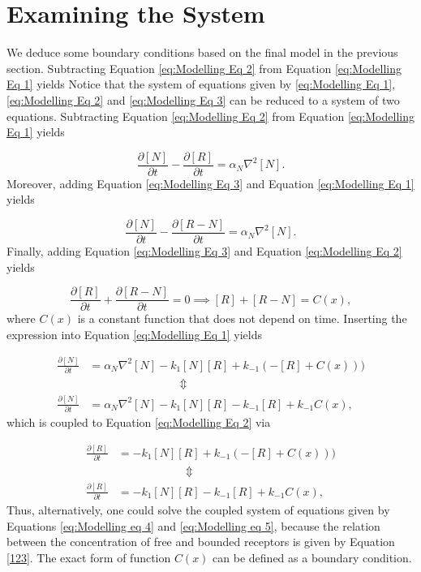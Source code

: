 \documentclass{article}
\begin{document}
\section{Examining the System}
We deduce some boundary conditions based on the final model in the previous section. Subtracting Equation \eqref{eq:Modelling Eq 2} from Equation \eqref{eq:Modelling Eq 1} yields
Notice that the system of equations given by \eqref{eq:Modelling Eq 1}, \eqref{eq:Modelling Eq 2} and \eqref{eq:Modelling Eq 3} can be reduced to a system of two equations. Subtracting Equation \eqref{eq:Modelling Eq 2} from Equation \eqref{eq:Modelling Eq 1} yields

\begin{equation}\label{eqn:addition1}
    \frac{\partial [N]}{\partial t}-\frac{\partial [R]}{\partial t} = \alpha_N\nabla^2[N].
\end{equation}
Moreover, adding Equation \eqref{eq:Modelling Eq 3} and Equation \eqref{eq:Modelling Eq 1} yields

\begin{equation}\label{eqn:addition2}
    \frac{\partial [N]}{\partial t}-\frac{\partial [R-N]}{\partial t} = \alpha_N\nabla^2[N].
\end{equation}
Finally, adding Equation \eqref{eq:Modelling Eq 3} and Equation \eqref{eq:Modelling Eq 2} yields 

\begin{equation}\label{123}
    \frac{\partial [R]}{\partial t}+\frac{\partial [R-N]}{\partial t} = 0 \implies [R] + [R-N] = C(x),  
\end{equation}
where $C(x)$ is a constant function that does not depend on time. Inserting the expression into Equation \eqref{eq:Modelling Eq 1} yields 

\begin{align}
    \frac{\partial [N]}{\partial t} &= \alpha_N\nabla^2[N]- k_1[N][R] + k_{-1}(-[R]+C(x)))\nonumber\\
    &\qquad \qquad \qquad \qquad \Updownarrow \nonumber\\
    \frac{\partial [N]}{\partial t} &= \alpha_N\nabla^2[N]- k_1[N][R] - k_{-1}[R] + k_{-1}C(x) \label{eq:Modelling eq 4},
\end{align}
which is coupled to Equation \eqref{eq:Modelling Eq 2} via 

\begin{align}
    \frac{\partial [R]}{\partial t} &= - k_1[N][R] + k_{-1}(-[R]+C(x)))\nonumber\\
    &\qquad \qquad \qquad \Updownarrow \nonumber\\
    \frac{\partial [R]}{\partial t} &= - k_1[N][R] - k_{-1}[R] + k_{-1}C(x) \label{eq:Modelling eq 5},
\end{align}
Thus, alternatively, one could solve the coupled system of equations given by Equations \eqref{eq:Modelling eq 4} and \eqref{eq:Modelling eq 5}, because the relation between the concentration of free and bounded receptors is given by Equation \eqref{123}. The exact form of function $C(x)$ can be defined as a boundary condition. 
\end{document}
